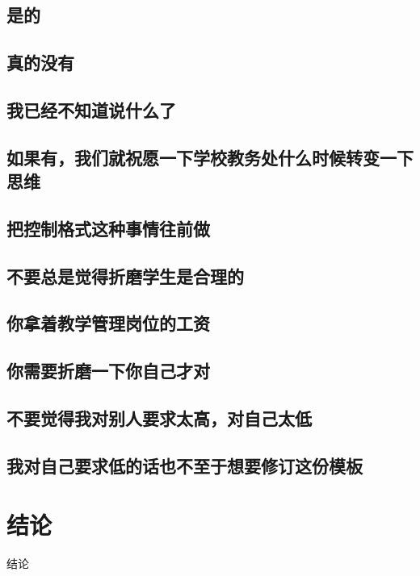 \documentclass[a4paper,AutoFakeBold,oneside,12pt]{book}
\begin{document}
\section{是的}
\section{真的没有}
\section{我已经不知道说什么了}
\section{如果有，我们就祝愿一下学校教务处什么时候转变一下思维}
\section{把控制格式这种事情往前做}
\section{不要总是觉得折磨学生是合理的}
\section{你拿着教学管理岗位的工资}
\section{你需要折磨一下你自己才对}
\section{不要觉得我对别人要求太高，对自己太低}
\section{我对自己要求低的话也不至于想要修订这份模板}

\backmatter
{}
\chapter*{结论}
\normalsize

结论


\clearpage{}

\end{document}

